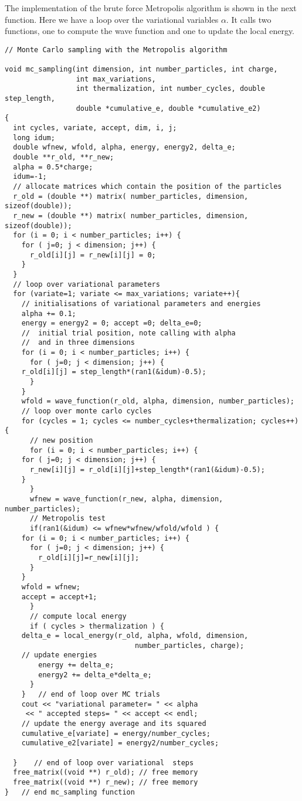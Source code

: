 The implementation of the brute force Metropolis algorithm is shown in the next function.
Here we have a loop over the variational variables $\alpha$. It calls two functions, one to compute the wave function
and one to update the local energy.
\begin{lstlisting}
// Monte Carlo sampling with the Metropolis algorithm  

void mc_sampling(int dimension, int number_particles, int charge, 
                 int max_variations, 
                 int thermalization, int number_cycles, double step_length, 
                 double *cumulative_e, double *cumulative_e2)
{
  int cycles, variate, accept, dim, i, j;
  long idum;
  double wfnew, wfold, alpha, energy, energy2, delta_e;
  double **r_old, **r_new;
  alpha = 0.5*charge;
  idum=-1;
  // allocate matrices which contain the position of the particles  
  r_old = (double **) matrix( number_particles, dimension, sizeof(double));
  r_new = (double **) matrix( number_particles, dimension, sizeof(double));
  for (i = 0; i < number_particles; i++) { 
    for ( j=0; j < dimension; j++) {
      r_old[i][j] = r_new[i][j] = 0;
    }
  }
  // loop over variational parameters  
  for (variate=1; variate <= max_variations; variate++){
    // initialisations of variational parameters and energies 
    alpha += 0.1;  
    energy = energy2 = 0; accept =0; delta_e=0;
    //  initial trial position, note calling with alpha 
    //  and in three dimensions 
    for (i = 0; i < number_particles; i++) { 
      for ( j=0; j < dimension; j++) {
	r_old[i][j] = step_length*(ran1(&idum)-0.5);
      }
    }
    wfold = wave_function(r_old, alpha, dimension, number_particles);
    // loop over monte carlo cycles 
    for (cycles = 1; cycles <= number_cycles+thermalization; cycles++){ 
      // new position 
      for (i = 0; i < number_particles; i++) { 
	for ( j=0; j < dimension; j++) {
	  r_new[i][j] = r_old[i][j]+step_length*(ran1(&idum)-0.5);
	}
      }
      wfnew = wave_function(r_new, alpha, dimension, number_particles); 
      // Metropolis test 
      if(ran1(&idum) <= wfnew*wfnew/wfold/wfold ) { 
	for (i = 0; i < number_particles; i++) { 
	  for ( j=0; j < dimension; j++) {
	    r_old[i][j]=r_new[i][j];
	  }
	}
	wfold = wfnew;
	accept = accept+1;
      }
      // compute local energy  
      if ( cycles > thermalization ) {
	delta_e = local_energy(r_old, alpha, wfold, dimension, 
                               number_particles, charge);
	// update energies  
        energy += delta_e;
        energy2 += delta_e*delta_e;
      }
    }   // end of loop over MC trials   
    cout << "variational parameter= " << alpha 
	 << " accepted steps= " << accept << endl;
    // update the energy average and its squared 
    cumulative_e[variate] = energy/number_cycles;
    cumulative_e2[variate] = energy2/number_cycles;
    
  }    // end of loop over variational  steps 
  free_matrix((void **) r_old); // free memory
  free_matrix((void **) r_new); // free memory
}   // end mc_sampling function  
\end{lstlisting}
